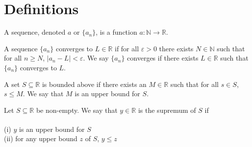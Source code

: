 %


\section{Definitions}

\begin{definition}[Sequence]
  \label{def:sequence}
  A sequence, denoted $a$ or $\{a_n\}$, is a function $a : ℕ → \mathbb{R}$.
\end{definition}

\begin{definition}[Convergence]
  \label{def:convergence}
  \leanok

  A sequence $\{a_n\}$ converges to $L ∈ \mathbb{R}$ if for all $\varepsilon > 0$ there exists
  $N ∈ ℕ$ such that for all $n ≥ N$, $|a_n - L| < \varepsilon$.
  We say $\{a_n\}$ converges if there exists $L ∈ \mathbb{R}$ such that $\{a_n\}$ converges to $L$.

\end{definition}

\begin{definition}
  \label{def:bounded_above}
  \leanok
  A set $S \subseteq \mathbb{R}$ is bounded above if there exists an $M \in \mathbb{R}$ such that for all $s \in S$, $s \le M$.
  We say that $M$ is an upper bound for $S$.
\end{definition}

\begin{definition}[supremum]
  \label{def:supremum}
  \leanok
  Let $S \subseteq \mathbb{R}$ be non-empty. We say that $y \in \mathbb{R}$ is the supremum of $S$ if \\ \\
  (i) $y$ is an upper bound for $S$ \\
  (ii) for any upper bound $z$ of $S$, $y \le z$
\end{definition}

